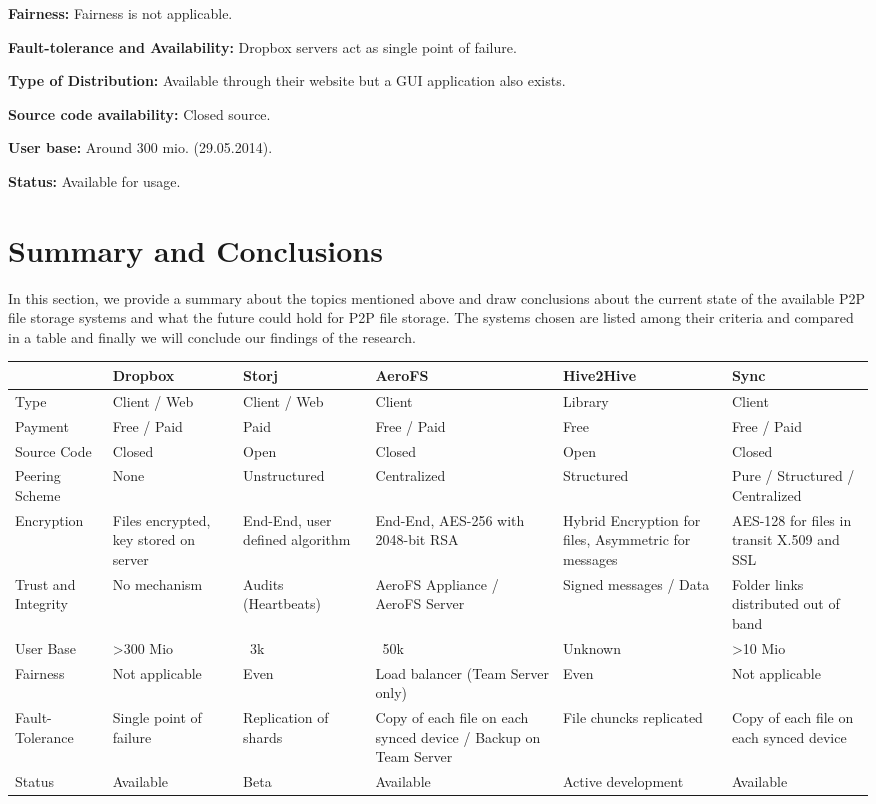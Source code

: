 \textbf{Fairness:} Fairness is not applicable.

\textbf{Fault-tolerance and Availability:} Dropbox servers act as single point of failure.

\textbf{Type of Distribution:} Available through their website but a GUI application also exists.

\textbf{Source code availability:} Closed source.

\textbf{User base:} Around 300 mio. (29.05.2014)\cite{dropbox:userbase}.

\textbf{Status:} Available for usage.

\section{Summary and Conclusions}
In this section, we provide a summary about the topics mentioned above and draw conclusions about the current state of the available P2P file storage systems and what the future could hold for P2P file storage. The systems chosen are listed among their criteria and compared in a table and finally we will conclude our findings of the research.

\begin{table}
	\centering
		\begin{tabular}{ | *{6}{ p{2.5cm} |} }
			\hline
			& Dropbox & Storj & AeroFS & Hive2Hive & Sync \\ \hline
			Type & Client / Web & Client / Web & Client & Library & Client \\ \hline
			Payment & Free / Paid & Paid & Free / Paid & Free & Free / Paid \\ \hline
			Source Code & Closed & Open & Closed & Open & Closed \\ \hline
			Peering Scheme & None & Unstructured & Centralized & Structured & Pure / Structured / Centralized \\ \hline
			Encryption & Files encrypted, key stored on server & End-End, user defined algorithm & End-End, AES-256 with 2048-bit RSA & Hybrid Encryption for files, Asymmetric for messages & AES-128 for files in transit X.509 and SSL \\ \hline
			Trust and Integrity & No mechanism & Audits (Heartbeats) & AeroFS Appliance / AeroFS Server & Signed messages / Data & Folder links distributed out of band \\ \hline
			User Base & >300 Mio & ~3k & ~50k & Unknown & >10 Mio \\ \hline
			Fairness & Not applicable & Even & Load balancer (Team Server only) & Even & Not applicable \\ \hline
			Fault-Tolerance & Single point of failure & Replication of shards & Copy of each file on each synced device / Backup on Team Server & File chuncks replicated & Copy of each file on each synced device \\ \hline
			Status & Available & Beta & Available & Active development & Available \\ \hline
		\end{tabular}
\end{table}

